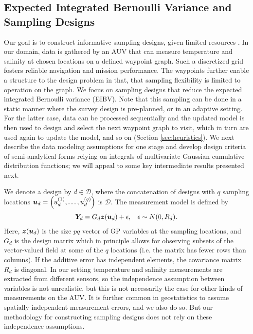 \documentclass[aoas]{imsart}
\begin{document}
\subsection{Expected Integrated Bernoulli Variance and Sampling Designs}
\label{sec:EIBV}

Our goal is to construct informative sampling designs, given limited
resources . In our domain, data is gathered by an AUV
that can measure temperature and salinity at chosen locations on a
defined waypoint graph. Such a discretized grid fosters reliable
navigation and mission performance. The waypoints further enable a
structure to the design problem in that, that sampling flexibility is
limited to operation on the graph. %
We focus on sampling designs that reduce the expected integrated
Bernoulli variance (EIBV). Note that this sampling can be done in a
static manner where the survey design is pre-planned, or in an
adaptive setting. For the latter case, data can be processed
sequentially and the updated model is then used to design and select
the next waypoint graph to visit, which in turn are used again to
update the model, and so on (Section \ref{sec:heuristics}). We next
describe the data modeling assumptions for one stage and develop
design criteria of semi-analytical forms relying on integrals of
multivariate Gaussian cumulative distribution functions; we will
appeal to some key intermediate results presented next.

We denote a design by $d \in \mathcal{D}$, where the concatenation of designs with $q$ sampling locations ${\boldsymbol u}_d=\left(u_d^{(1)},\ldots, u_d^{(q)}\right)$ is $\mathcal{D}$. The
measurement model is defined by 
\begin{equation}\label{eq:meas}
    \bY_d=G_d \bz(\bu_d) + \epsilon, \hspace{3mm} \epsilon \sim N(0,R_d).
\end{equation}
Here, ${\boldsymbol z}({\boldsymbol u}_d)$ is the size $pq$ vector of GP variables at the
sampling locations, and $G_d$ is the design matrix which in principle
allows for observing subsets of the vector-valued field at some of the
$q$ locations (i.e. the matrix has fewer rows than columns). If the
additive error has independent elements, the covariance matrix $R_d$
is diagonal. In our setting temperature and salinity measurements are
extracted from different sensors, so the independence assumption
between variables is not unrealistic, but this is not necessarily the
case for other kinds of measurements on the AUV. It is further common
in geostatistics to assume spatially independent measurement errors,
and we also do so. But our methodology for constructing sampling
designs does not rely on these independence assumptions.
\end{document}

